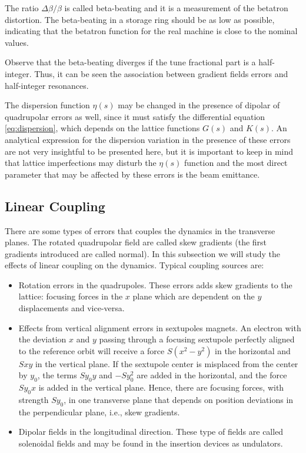 The ratio $\Delta \beta/\beta$ is called beta-beating and it is a measurement of the betatron distortion. The beta-beating in a storage ring should be as low as possible, indicating that the betatron function for the real machine is close to the nominal values.

Observe that the beta-beating diverges if the tune fractional part is a half-integer. Thus, it can be seen the association between gradient fields errors and half-integer resonances.

The dispersion function $\eta(s)$ may be changed in the presence of dipolar of quadrupolar errors as well, since it must satisfy the differential equation \eqref{eq:dispersion}, which depends on the lattice functions $G(s)$ and $K(s)$. An analytical expression for the dispersion variation in the presence of these errors are not very insightful to be presented here, but it is important to keep in mind that lattice imperfections may disturb the $\eta(s)$ function and the most direct parameter that may be affected by these errors is the beam emittance.

\subsection{Linear Coupling}\label{subsec:linear_coupling}

There are some types of errors that couples the dynamics in the transverse planes. The rotated quadrupolar field are called skew gradients (the first gradients introduced are called normal). In this subsection we will study the effects of linear coupling on the dynamics. Typical coupling sources are:

\begin{itemize}
    \item Rotation errors in the quadrupoles. These errors adds skew gradients to the lattice: focusing forces in the $x$ plane which are dependent on the $y$ displacements and vice-versa.
    
    \item Effects from vertical alignment errors in sextupoles magnets. An electron with the deviation $x$ and $y$ passing through a focusing sextupole perfectly aligned to the reference orbit will receive a force $S(x^2-y^2)$ in the horizontal and $Sxy$ in the vertical plane. If the sextupole center is misplaced from the center by $y_0$, the terms $Sy_0 y$ and $-Sy_0^2$ are added in the horizontal, and the force $Sy_0 x$ is added in the vertical plane. Hence, there are focusing forces, with strength $Sy_0$, in one transverse plane that depends on position deviations in the perpendicular plane, i.e., skew gradients.
    
    \item Dipolar fields in the longitudinal direction. These type of fields are called solenoidal fields and may be found in the insertion devices as undulators.
\end{itemize}

